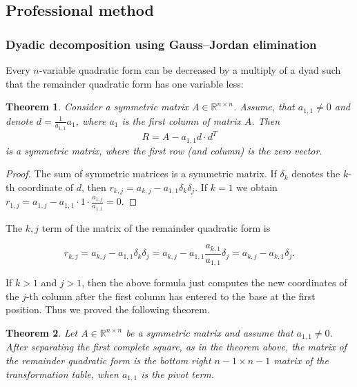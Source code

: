 \documentclass[aspectratio=169,notheorems]{corvinusmetropolis}
\newtheorem{theorem}{Theorem}
\theoremstyle{definition}
\begin{document}
\subsection{Professional method}

\begin{frame}
    \frametitle{Dyadic decomposition using Gauss--Jordan elimination}
    Every $n$-variable quadratic form can be decreased by a multiply of a dyad such that
    the remainder quadratic form has one variable less:
    \begin{theorem}
        Consider a symmetric matrix $A\in\mathbb{R}^{n\times n}$.
        Assume, that $a_{1,1}\neq 0$ and denote $d=\frac{1}{a_{1,1}}a_1$,
        where $a_1$ is the first column of matrix $A$.
        Then 
        \[
            R=A-a_{1,1}d\cdot d^T
        \]
        is a symmetric matrix, where the first row (and column) is the zero vector.
    \end{theorem}
    \begin{proof}
        The sum of symmetric matrices is a symmetric matrix.
        If $\delta_k$ denotes the $k$-th coordinate of $d$, then
        \(
            r_{k,j}=
            a_{k,j}-a_{1,1}\delta_{k}\delta_j.
        \)
        If $k=1$ we obtain $r_{1,j}=a_{1,j}-a_{1,1}\cdot 1\cdot\frac{a_{1,j}}{a_{1,1}}=0$.
    \end{proof}
\end{frame}

\begin{frame}
    The $k,j$ term of the matrix of the remainder quadratic form is
    \begin{block}{}
    \[
        r_{k,j}=
        a_{k,j}-a_{1,1}\delta_k\delta_j=
        a_{k,j}-a_{1,1}\frac{a_{k,1}}{a_{1,1}}\delta_j=
        a_{k,j}-a_{k,1}\delta_j.
    \]
    \end{block}
    If $k>1$ and $j>1$, then the above formula just computes
    the new coordinates of the $j$-th column after the first column has entered to the base at the first position.
    Thus we proved the following theorem.
    \begin{theorem}
        Let $A\in\mathbb{R}^{n\times n}$ be a symmetric matrix and assume that $a_{1,1}\neq 0$.
        After separating the first complete square, as in the theorem above, the matrix of the remainder quadratic form
        is the bottom right $n-1\times n-1$ matrix of the transformation table, when $a_{1,1}$ is the pivot term.
    \end{theorem}
\end{frame}
\end{document}
